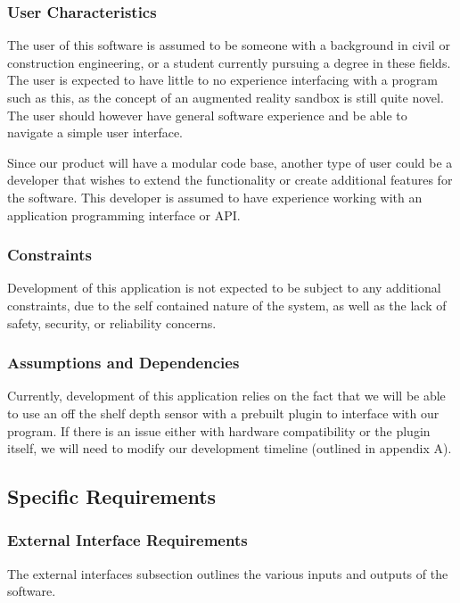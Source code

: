 \subsubsection{User Characteristics}
The user of this software is assumed to be someone with a background in civil or construction engineering, or a student currently pursuing a degree in these fields.
The user is expected to have little to no experience interfacing with a program such as this, as the concept of an augmented reality sandbox is still quite novel.
The user should however have general software experience and be able to navigate a simple user interface.
\par Since our product will have a modular code base, another type of user could be a developer that wishes to extend the functionality or create additional features for the software. This developer is assumed to have experience working with an application programming interface or API.

\subsubsection{Constraints}
Development of this application is not expected to be subject to any additional constraints, due to the self contained nature of the system, as well as the lack of safety, security, or reliability concerns.

\subsubsection{Assumptions and Dependencies}
Currently, development of this application relies on the fact that we will be able to use an off the shelf depth sensor with a prebuilt plugin to interface with our program. 
If there is an issue either with hardware compatibility or the plugin itself, we will need to modify our development timeline (outlined in appendix A).


\subsection{Specific Requirements}
\subsubsection{External Interface Requirements}

The external interfaces subsection outlines the various inputs and outputs of the software.

